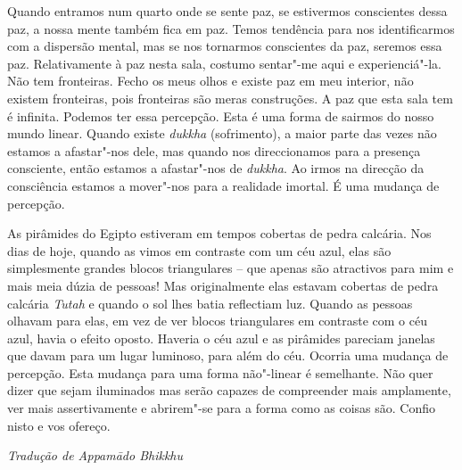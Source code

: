 Quando entramos num quarto onde se sente paz, se estivermos conscientes
dessa paz, a nossa mente também fica em paz. Temos tendência para nos
identificarmos com a dispersão mental, mas se nos tornarmos conscientes
da paz, seremos essa paz. Relativamente à paz nesta sala, costumo
sentar"-me aqui e experienciá"-la. Não tem fronteiras. Fecho os meus olhos
e existe paz em meu interior, não existem fronteiras, pois fronteiras
são meras construções. A paz que esta sala tem é infinita. Podemos ter
essa percepção. Esta é uma forma de sairmos do nosso mundo linear.
Quando existe \emph{dukkha} (sofrimento), a maior parte das vezes não
estamos a afastar"-nos dele, mas quando nos direccionamos para a presença
consciente, então estamos a afastar"-nos de \emph{dukkha}. Ao irmos na
direcção da consciência estamos a mover"-nos para a realidade imortal. É
uma mudança de percepção.

As pirâmides do Egipto estiveram em tempos cobertas de pedra calcária.
Nos dias de hoje, quando as vimos em contraste com um céu azul, elas são
simplesmente grandes blocos triangulares -- que apenas são atractivos
para mim e mais meia dúzia de pessoas! Mas originalmente elas estavam
cobertas de pedra calcária \emph{Tutah} e quando o sol lhes batia
reflectiam luz. Quando as pessoas olhavam para elas, em vez de ver
blocos triangulares em contraste com o céu azul, havia o efeito oposto.
Haveria o céu azul e as pirâmides pareciam janelas que davam para um
lugar luminoso, para além do céu. Ocorria uma mudança de percepção. Esta
mudança para uma forma não"-linear é semelhante. Não quer dizer que sejam
iluminados mas serão capazes de compreender mais amplamente, ver mais
assertivamente e abrirem"-se para a forma como as coisas são. Confio
nisto e vos ofereço.


\vfill
{\raggedleft\itshape\small
  Tradução de Appamādo Bhikkhu
\par}

